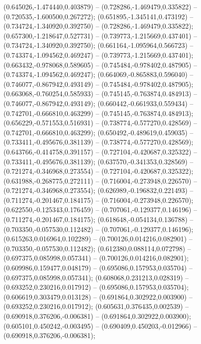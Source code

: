  (0.645026,-1.474440,0.403879) -- (0.728286,-1.469479,0.335822) -- (0.720535,-1.600500,0.267272);
 (0.651895,-1.345141,0.473192) -- (0.734724,-1.340920,0.392750) -- (0.728286,-1.469479,0.335822);
 (0.657300,-1.218647,0.527731) -- (0.739773,-1.215669,0.437401) -- (0.734724,-1.340920,0.392750);
 (0.661164,-1.095964,0.566723) -- (0.743374,-1.094562,0.469247) -- (0.739773,-1.215669,0.437401);
 (0.663432,-0.978068,0.589605) -- (0.745484,-0.978402,0.487905) -- (0.743374,-1.094562,0.469247);
 (0.664069,-0.865883,0.596040) -- (0.746077,-0.867942,0.493149) -- (0.745484,-0.978402,0.487905);
 (0.663068,-0.760254,0.585933) -- (0.745145,-0.763874,0.484913) -- (0.746077,-0.867942,0.493149);
 (0.660442,-0.661933,0.559434) -- (0.742701,-0.666810,0.463299) -- (0.745145,-0.763874,0.484913);
 (0.656229,-0.571553,0.516931) -- (0.738774,-0.577270,0.428569) -- (0.742701,-0.666810,0.463299);
 (0.650492,-0.489619,0.459035) -- (0.733411,-0.495676,0.381139) -- (0.738774,-0.577270,0.428569);
 (0.643766,-0.414758,0.391157) -- (0.727104,-0.420687,0.325322) -- (0.733411,-0.495676,0.381139);
 (0.637570,-0.341353,0.328569) -- (0.721274,-0.346968,0.273554) -- (0.727104,-0.420687,0.325322);
 (0.631988,-0.268775,0.272111) -- (0.716004,-0.273948,0.226570) -- (0.721274,-0.346968,0.273554);
 (0.626989,-0.196832,0.221493) -- (0.711274,-0.201467,0.184175) -- (0.716004,-0.273948,0.226570);
 (0.622550,-0.125343,0.176459) -- (0.707061,-0.129377,0.146196) -- (0.711274,-0.201467,0.184175);
 (0.618648,-0.054134,0.136788) -- (0.703350,-0.057530,0.112482) -- (0.707061,-0.129377,0.146196);
 (0.615263,0.016964,0.102289) -- (0.700126,0.014216,0.082901) -- (0.703350,-0.057530,0.112482);
 (0.612380,0.088114,0.072798) -- (0.697375,0.085998,0.057341) -- (0.700126,0.014216,0.082901);
 (0.609986,0.159477,0.048179) -- (0.695086,0.157953,0.035704) -- (0.697375,0.085998,0.057341);
 (0.608068,0.231213,0.028319) -- (0.693252,0.230216,0.017912) -- (0.695086,0.157953,0.035704);
 (0.606619,0.303479,0.013128) -- (0.691864,0.302922,0.003900) -- (0.693252,0.230216,0.017912);
 (0.605631,0.376435,0.002539) -- (0.690918,0.376206,-0.006381) -- (0.691864,0.302922,0.003900);
 (0.605101,0.450242,-0.003495) -- (0.690409,0.450203,-0.012966) -- (0.690918,0.376206,-0.006381);
